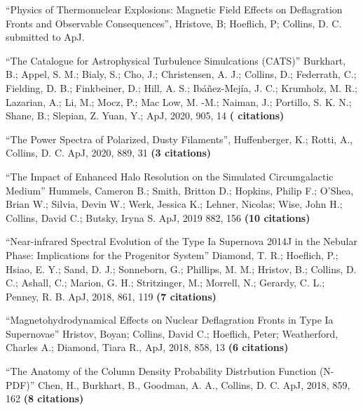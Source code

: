 \newcommand{\citeform}[1]{{\bf (#1 citations)}}

\medskip
\noindent

``Physics of Thermonuclear Explosions: Magnetic Field Effects on Deflagration Fronts and Observable Consequences'', Hristove, B; Hoeflich, P; Collins, D. C. submitted to ApJ.

\medskip
\noindent
``The Catalogue for Astrophysical Turbulence Simulcations (CATS)'' Burkhart, B.; Appel, S. M.; Bialy, S.; Cho, J.; Christensen, A. J.; Collins, D.; Federrath, C.; Fielding, D. B.; Finkbeiner, D.; Hill, A. S.; Ibáñez-Mejía, J. C.; Krumholz, M. R.; Lazarian, A.; Li, M.; Mocz, P.; Mac Low, M. -M.; Naiman, J.; Portillo, S. K. N.; Shane, B.; Slepian, Z. Yuan, Y.;  ApJ, 2020, 905, 14
\citeform{}%


\medskip
\noindent
``The Power Spectra of Polarized, Dusty Filaments'', Huffenberger, K.; Rotti,
A., Collins, D. C. ApJ, 2020, 889, 31
\citeform{3}%

\medskip
\noindent
``The Impact of Enhanced Halo Resolution on the Simulated Circumgalactic Medium''
Hummels, Cameron B.; Smith, Britton D.; Hopkins, Philip F.; O'Shea, Brian W.; Silvia, Devin W.; 
Werk, Jessica K.; Lehner, Nicolas; Wise, John H.; Collins, David C.; Butsky, Iryna S.   
ApJ, 2019 882, 156
\citeform{10}%

\medskip
\noindent
``Near-infrared Spectral Evolution of the Type Ia Supernova 2014J in the Nebular
Phase: Implications for the Progenitor System''
Diamond, T. R.; Hoeflich, P.; Hsiao, E. Y.; Sand, D. J.; Sonneborn, G.;
Phillips, M. M.; Hristov, B.; Collins, D. C.; Ashall, C.; Marion, G. H.;
Stritzinger, M.; Morrell, N.; Gerardy, C. L.; Penney, R. B.
ApJ, 2018, 861, 119
\citeform{7}%

\medskip
\noindent
``Magnetohydrodynamical Effects on Nuclear Deflagration Fronts in Type Ia Supernovae''
Hristov, Boyan; Collins, David C.; Hoeflich, Peter; Weatherford, Charles A.; Diamond, Tiara R., 
ApJ, 2018, 858, 13
\citeform{6}%


\medskip
\noindent
``The Anatomy of the Column Density Probability Distrbution Function (N-PDF)''
Chen, H., Burkhart, B., Goodman, A. A., Collins, D. C. 
ApJ, 2018, 859, 162
\citeform{8}%

